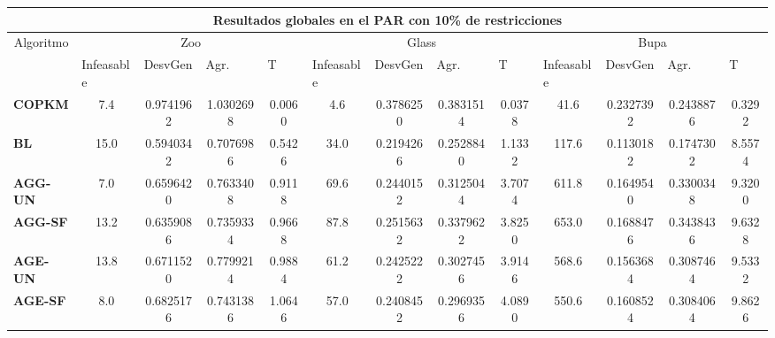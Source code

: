 \begin{table}[H]
\begin{adjustwidth}{-1cm}{-1cm}
	\begin{tabular}{|l|c|c|c|c|c|c|c|c|c|c|c|c|}
	\hline
	\multicolumn{13}{|c|}{\textbf{Resultados globales en el PAR con 10\% de restricciones}}                                                                                                                                                                                                                                                                                                                                            \\ \hline
	\multicolumn{1}{|c|}{\multirow{2}{*}{Algoritmo}} & \multicolumn{4}{c|}{Zoo}                                                                                          & \multicolumn{4}{c|}{Glass}                                                                                         & \multicolumn{4}{c|}{Bupa}                                                                                          \\ \cline{2-13} 
	\multicolumn{1}{|c|}{}                                  & \multicolumn{1}{l|}{Infeasable} & \multicolumn{1}{l|}{DesvGen} & \multicolumn{1}{l|}{Agr.} & \multicolumn{1}{l|}{T} & \multicolumn{1}{l|}{Infeasable} & \multicolumn{1}{l|}{DesvGen} & \multicolumn{1}{l|}{Agr.} & \multicolumn{1}{l|}{T} & \multicolumn{1}{l|}{Infeasable} & \multicolumn{1}{l|}{DesvGen} & \multicolumn{1}{l|}{Agr.} & \multicolumn{1}{l|}{T} \\ \hline
	\textbf{COPKM}      & 7.4 & 0.9741962 & 1.0302698 & 0.0060		& 4.6 & 0.3786250 & 0.3831514 & 0.0378     & 41.6 & 0.2327392 & 0.2438876 & 0.3292  \\ \hline
	\textbf{BL}    & 15.0 & 0.5940342  & 0.7076986 & 0.5426 & 34.0 & 0.2194266 & 0.2528840 & 1.1332 			& 117.6 & 0.1130182 & 0.1747302 & 8.5574		\\ \hline
	\textbf{AGG-UN}    & 7.0 & 	0.6596420 & 	0.7633408 & 	0.9118 & 	69.6 & 	0.2440152 & 	0.3125044 & 	3.7074 & 	611.8 & 	0.1649540 & 	0.3300348 & 	9.3200		\\ \hline
	\textbf{AGG-SF}     & 13.2 & 	0.6359086 & 	0.7359334 & 	0.9668 & 	87.8 & 	0.2515632 & 	0.3379622 & 	3.8250 & 	653.0 & 	0.1688476 & 	0.3438436 & 	9.6328		\\ \hline
	\textbf{AGE-UN}    &  13.8 & 	0.6711520 & 	0.7799214 & 	0.9884 & 	61.2 & 	0.2425222 & 	0.3027456 & 	3.9146 & 	568.6 & 	0.1563684 & 	0.3087464 & 	9.5332		\\ \hline
	\textbf{AGE-SF}    & 8.0 & 	0.6825176 & 	0.7431386 & 	1.0646 & 	57.0 & 	0.2408452 & 	0.2969356 & 	4.0890 & 	550.6 & 	0.1608524 & 	0.3084064 & 	9.8626	\\ \hline

\end{tabular}
\end{adjustwidth}
\end{table}
